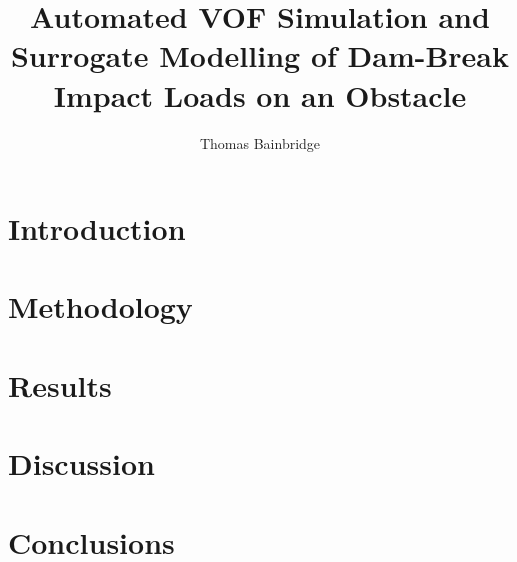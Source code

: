 \documentclass[preprint,a4paper,12pt]{elsarticle}
\begin{document}
\begin{frontmatter}

\title{Automated VOF Simulation and Surrogate Modelling of Dam-Break Impact Loads on an Obstacle}

\author{Thomas Bainbridge}

\begin{abstract}

\end{abstract}

\begin{keyword}

\end{keyword}

\end{frontmatter}

\section{Introduction}

\section{Methodology}

\section{Results}

\section{Discussion}

\section{Conclusions}

%
%
\end{document}
